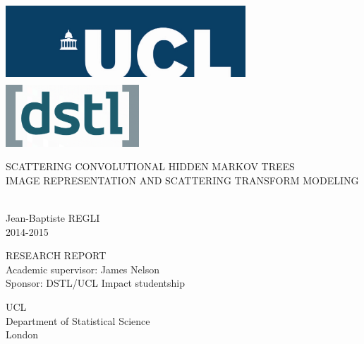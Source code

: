 \documentclass[a4paper,11pt]{report}
\begin{document}
	\begin{titlepage}
		\hspace{-1.5cm}\includegraphics[width=9cm,height= 3cm]{ucl.jpg}
		\hfill{
		  \raggedleft \includegraphics[width=5cm]{dstl.png}
		}
		\vspace*{5cm}
	
		\begin{center}
			\begin{sc} 	
				\huge SCATTERING CONVOLUTIONAL HIDDEN MARKOV TREES
				\vspace*{0.2cm}
				\\ \large IMAGE REPRESENTATION AND SCATTERING TRANSFORM MODELING
				\vspace*{2cm}
			\end{sc}
			\\ \LARGE Jean-Baptiste REGLI
			\vspace*{0.2cm}
			\\ \large 2014-2015
		\end{center}

		\vfill
		\begin{center}
			\vspace*{1cm}
			\Large RESEARCH REPORT
			\vspace*{0.5cm}
			\\ \large Academic supervisor: James Nelson 
			\\ \large Sponsor: DSTL/UCL Impact studentship
			
			\vspace*{1cm}
			\Large UCL
			\\ \normalsize Department of Statistical Science
			\\ London
		\end{center}
	\end{titlepage}
	\clearpage
\end{document}
